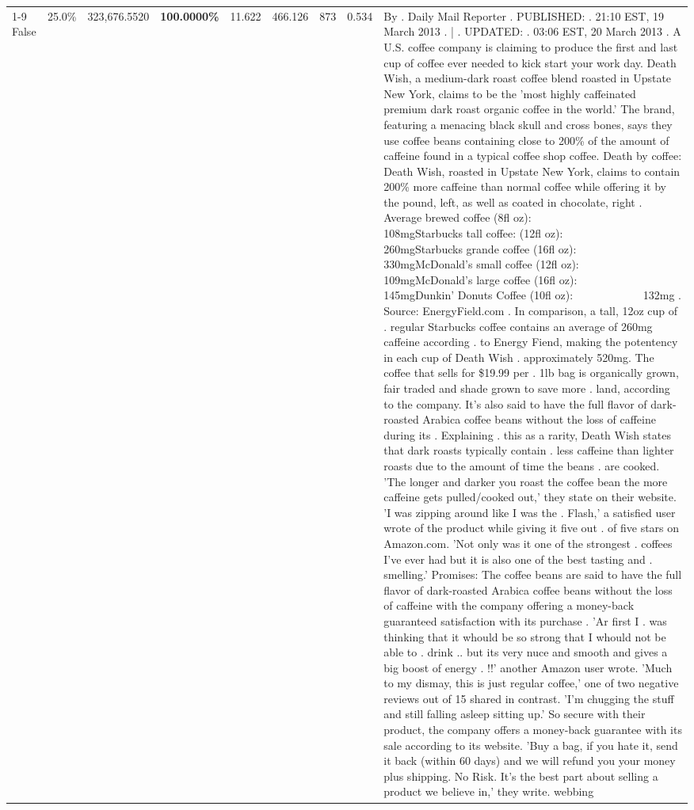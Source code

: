 \begin{table}[H]
{\begin{tabular}{lllrlllll}
\cline{1-9}
False & 25.0\% & 323,676.5520 & \bfseries \color{red} 100.0000\% & 11.622 & 466.126 & 873 & 0.534 & By . Daily Mail Reporter . PUBLISHED: . 21:10 EST, 19 March 2013 . | . UPDATED: . 03:06 EST, 20 March 2013 . A U.S. coffee company is claiming to produce the first and last cup of coffee ever needed to kick start your work day. Death Wish, a medium-dark roast coffee blend roasted in Upstate New York, claims to be the 'most highly caffeinated premium dark roast organic coffee in the world.' The brand, featuring a menacing black skull and cross bones, says they use coffee beans containing close to 200\% of the amount of caffeine found in a typical coffee shop coffee. Death by coffee: Death Wish, roasted in Upstate New York, claims to contain 200\% more caffeine than normal coffee while offering it by the pound, left, as well as coated in chocolate, right . Average brewed coffee (8fl oz):              108mgStarbucks tall coffee: (12fl oz):                260mgStarbucks grande coffee (16fl oz):         330mgMcDonald's small coffee (12fl oz):           109mgMcDonald's large coffee (16fl oz):           145mgDunkin' Donuts Coffee (10fl oz):             132mg . Source: EnergyField.com . In comparison, a tall, 12oz cup of . regular Starbucks coffee contains an average of 260mg caffeine according . to Energy Fiend, making the potentency in each cup of Death Wish . approximately 520mg. The coffee that sells for \$19.99 per . 1lb bag is organically grown, fair traded and shade grown to save more . land, according to the company. It's also said to have the full flavor of dark-roasted Arabica coffee beans without the loss of caffeine during its . Explaining . this as a rarity, Death Wish states that dark roasts typically contain . less caffeine than lighter roasts due to the amount of time the beans . are cooked. 'The longer and darker you roast the coffee bean the more caffeine gets pulled/cooked out,' they state on their website. 'I was zipping around like I was the . Flash,' a satisfied user wrote of the product while giving it five out . of five stars on Amazon.com. 'Not only was it one of the strongest . coffees I've ever had but it is also one of the best tasting and . smelling.’ Promises: The coffee beans are said to have the full flavor of dark-roasted Arabica coffee beans without the loss of caffeine with the company offering a money-back guaranteed satisfaction with its purchase . 'Ar first I . was thinking that it whould be so strong that I whould not be able to . drink .. but its very nuce and smooth and gives a big boost of energy . !!' another Amazon user wrote. 'Much to my dismay, this is just regular coffee,' one of two negative reviews out of 15 shared in contrast. 'I'm chugging the stuff and still falling asleep sitting up.' So secure with their product, the company offers a money-back guarantee with its sale according to its website. 'Buy a bag, if you hate it, send it back (within 60 days) and we will refund you your money plus shipping. No Risk. It’s the best part about selling a product we believe in,' they write. webbing \\

\end{tabular}}
\end{table}
